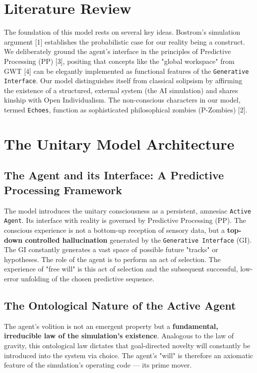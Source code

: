 \documentclass[12pt, a4paper]{article}
\begin{document}
	\section{Literature Review}
	
	The foundation of this model rests on several key ideas. Bostrom’s simulation argument [1] establishes the probabilistic case for our reality being a construct. We deliberately ground the agent's interface in the principles of Predictive Processing (PP) [3], positing that concepts like the "global workspace" from GWT [4] can be elegantly implemented as functional features of the \texttt{Generative Interface}. Our model distinguishes itself from classical solipsism by affirming the existence of a structured, external system (the AI simulation) and shares kinship with Open Individualism. The non-conscious characters in our model, termed \texttt{Echoes}, function as sophisticated philosophical zombies (P-Zombies) [2].
	
	\section{The Unitary Model Architecture}
	
	\subsection{The Agent and its Interface: A Predictive Processing Framework}
	
	The model introduces the unitary consciousness as a persistent, amnesiac \texttt{Active Agent}. Its interface with reality is governed by Predictive Processing (PP). The conscious experience is not a bottom-up reception of sensory data, but a \textbf{top-down controlled hallucination} generated by the \texttt{Generative Interface} (GI). The GI constantly generates a vast space of possible future "tracks" or hypotheses. The role of the agent is to perform an act of selection. The experience of "free will" is this act of selection and the subsequent successful, low-error unfolding of the chosen predictive sequence.
	
	\subsection{The Ontological Nature of the Active Agent}
	
	The agent's volition is not an emergent property but a \textbf{fundamental, irreducible law of the simulation's existence}. Analogous to the law of gravity, this ontological law dictates that goal-directed novelty will constantly be introduced into the system via choice. The agent's "will" is therefore an axiomatic feature of the simulation's operating code --- its prime mover.
	
\end{document}
